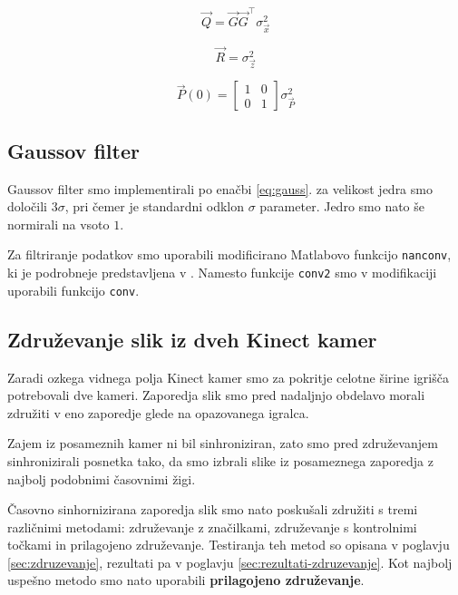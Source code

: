 \begin{equation}
\vec{Q} = \vec{G} \vec{G}^\top \sigma_\vec{x}^2
\label{eq:Q}
\end{equation}

\begin{equation}
\vec{R} = \sigma_\vec{z}^2
\label{eq:R}
\end{equation}

\begin{equation}
\vec{P}(0) = \begin{bmatrix}
1 & 0 \\
0 & 1
\end{bmatrix} \sigma_\vec{P}^2
\label{eq:P}
\end{equation}










\subsection{Gaussov filter}\label{sec:implementacija-gauss}

Gaussov filter smo implementirali po enačbi \eqref{eq:gauss}. za velikost jedra smo določili $3\sigma$, pri čemer je standardni odklon $\sigma$ parameter. Jedro smo nato še normirali na vsoto $1$. 

Za filtriranje podatkov smo uporabili modificirano Matlabovo funkcijo \texttt{nanconv}, ki je podrobneje predstavljena v \cite{kraus2017nanconv}. Namesto funkcije \texttt{conv2} smo v modifikaciji uporabili funkcijo \texttt{conv}.






\subsection{Združevanje slik iz dveh Kinect kamer}
Zaradi ozkega vidnega polja Kinect kamer smo za pokritje celotne širine igrišča potrebovali dve kameri. Zaporedja slik smo pred nadaljnjo obdelavo morali združiti v eno zaporedje glede na opazovanega igralca.

Zajem iz posameznih kamer ni bil sinhroniziran, zato smo pred združevanjem sinhronizirali posnetka tako, da smo izbrali slike iz posameznega zaporedja z najbolj podobnimi časovnimi žigi.

Časovno sinhornizirana zaporedja slik smo nato poskušali združiti s tremi različnimi metodami:  združevanje z značilkami, združevanje s kontrolnimi točkami in prilagojeno združevanje. Testiranja teh metod so opisana v poglavju \ref{sec:zdruzevanje}, rezultati pa v poglavju \ref{sec:rezultati-zdruzevanje}. Kot najbolj uspešno metodo smo nato uporabili \textbf{prilagojeno združevanje}.

